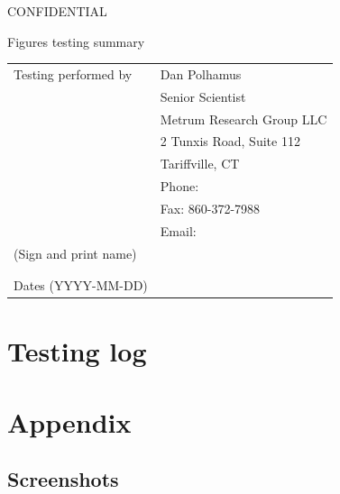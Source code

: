 \documentclass{article}
\newcommand{\topic}{Figures testing summary}
\newcommand{\testinglog}{figures-testing-log-complete.pdf}
\begin{document}
\vspace*{1cm}
\begin{center}
{\large CONFIDENTIAL}


\vspace*{1cm}


\vspace*{1cm}

{\Large \topic}
\vspace{3.0cm}
\end{center}

\newpage
\vspace*{1cm}
\begin{center}
\vspace{3.0cm}

\begin{tabular}{|l|l|}\hline
Testing performed by &   Dan Polhamus\\
                      &  Senior Scientist \\
                      &  Metrum Research Group LLC \\
                      &  2 Tunxis Road, Suite 112\\
                      &  Tariffville, CT\\
                      &  Phone:  \\
                      &  Fax: 860-372-7988 \\
                      &  Email:  \\\hline
 (Sign and print name) & \\
                       & \\
                       & \\\hline
Dates (YYYY-MM-DD)     &               \\\hline



\end{tabular}

\end{center}

\newpage

\section*{Testing log}



\newpage


\section*{Appendix}

\subsection*{Screenshots}




\end{document}
